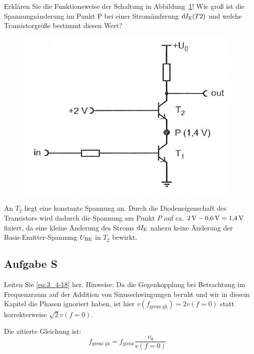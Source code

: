 \begin{problem}
    Erklären Sie die Funktionsweise der Schaltung in
    Abbildung~\ref{fig:3_4-15}! Wie groß ist die Spannungsänderung im Punkt P
    bei einer Stromänderung $\dif  \IE(T2)$ und welche
    Transistorgröße bestimmt diesen Wert?
\end{problem}

\begin{figure}[htbp]
    \centering
    \includegraphics[width=.6\textwidth]{Anleitung/3_4-15.png}
    \caption{%
        \cite[Abbildung~3/4.15]{physik313-Anleitung}
    }
    \label{fig:3_4-15}
\end{figure}

An $T_2$ liegt eine konstante Spannung an. Durch die Diodeneigenschaft des
Transistors wird dadurch die Spannung am Punkt $P$ auf ca. $\SI 2{\volt} -
\SI{0.6}{\volt} = \SI{1.4}{\volt}$ fixiert, da eine kleine Änderung des Stroms
$\dif\IE$ nahezu keine Änderung der Basis-Emitter-Spannung $U_\text{BE}$ in $T_2$
bewirkt.

\FloatBarrier
\subsection{Aufgabe S}

\begin{problem}
    Leiten Sie \eqref{eq:3_4-18} her. Hinweise: Da die Gegenkopplung bei
    Betrachtung im Frequenzraum auf der Addition von Sinusschwingungen beruht
    und wir in diesem Kapitel die Phasen ignoriert haben, ist hier
    $v(f_\text{grenz gk}) = 2v(f=0)$ statt korrekterweise $\sqrt 2 v (f = 0)$.
\end{problem}

Die zitierte Gleichung ist:
\begin{equation}
    \label{eq:3_4-18}
    f_\text{grenz gk} = f_\text{grenz} \frac{v_0}{v(f=0)}
\end{equation}

